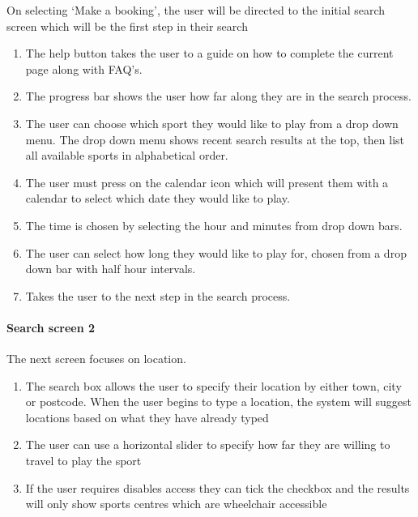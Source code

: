 On selecting `Make a booking', the user will be directed to the initial search
screen which will be the first step in their search

\begin{enumerate}
	\item The help button takes the user to a guide on how to complete the
		current page along with FAQ's.
	\item The progress bar shows the user how far along they are in the search
		process.
	\item The user can choose which sport they would like to play from a drop
		down menu. The drop down menu shows recent search results at the top,
		then list all available sports in alphabetical order.
	\item The user must press on the calendar icon which will present them with
		a calendar to select which date they would like to play.
	\item The time is chosen by selecting the hour and minutes from drop down
		bars.
	\item The user can select how long they would like to play for, chosen from
		a drop down bar with half hour intervals.
	\item Takes the user to the next step in the search process.
\end{enumerate}

\paragraph{Search screen 2}

The next screen focuses on location.

\begin{enumerate}
	\item The search box allows the user to specify their location by either
		town, city or postcode. When the user begins to type a location, the
		system will suggest locations based on what they have already typed
	\item The user can use a horizontal slider to specify how far they are
		willing to travel to play the sport
	\item If the user requires disables access they can tick the checkbox and
		the results will only show sports centres which are wheelchair
		accessible
\end{enumerate}

